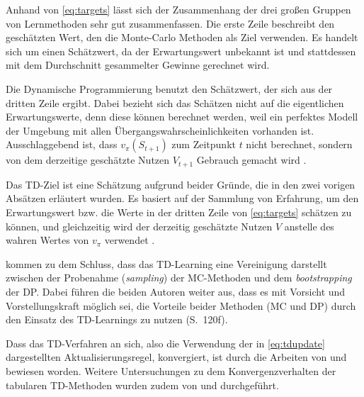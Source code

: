 Anhand von \ref{eq:targets} lässt sich der Zusammenhang der drei großen Gruppen von Lernmethoden sehr gut zusammenfassen. Die erste Zeile beschreibt den geschätzten Wert, den die Monte-Carlo Methoden als Ziel verwenden. Es handelt sich um einen Schätzwert, da der Erwartungswert unbekannt ist und stattdessen mit dem Durchschnitt gesammelter Gewinne gerechnet wird. 
\par 
Die Dynamische Programmierung benutzt den Schätzwert, der sich aus der dritten Zeile ergibt. Dabei bezieht sich das Schätzen nicht auf die eigentlichen Erwartungswerte, denn diese können berechnet werden, weil ein perfektes Modell der Umgebung mit allen Übergangswahrscheinlichkeiten vorhanden ist. Ausschlaggebend ist, dass $v_\pi(S_{t+1})$ zum Zeitpunkt $t$ nicht berechnet, sondern von dem derzeitige geschätzte Nutzen $V_{t+1}$ Gebrauch gemacht wird \cite[S.~120]{Sutton1998}.
\par 
Das TD-Ziel ist eine Schätzung aufgrund beider Gründe, die in den zwei vorigen Absätzen erläutert wurden. Es basiert auf der Sammlung von Erfahrung, um den Erwartungswert bzw. die Werte in der dritten Zeile von \ref{eq:targets} schätzen zu können, und gleichzeitig wird der derzeitig geschätzte Nutzen $V$ anstelle des wahren Wertes von $v_\pi$ verwendet \cite[S.~120f]{Sutton1998}.
\par
\cite{Sutton1998} kommen zu dem Schluss, dass das TD-Learning eine Vereinigung darstellt zwischen der Probenahme (\textit{sampling}) der MC-Methoden und dem \textit{bootstrapping} der DP. Dabei führen die beiden Autoren weiter aus, dass es mit \glqq Vorsicht und Vorstellungskraft\grqq{} möglich sei, die Vorteile beider Methoden (MC und DP) durch den Einsatz des TD-Learnings zu nutzen (S.~120f).
\par
Dass das TD-Verfahren an sich, also die Verwendung der in \ref{eq:tdupdate} dargestellten Aktualisierungsregel, konvergiert, ist durch die Arbeiten von \cite{sutton1988TD} und \cite{dayan} bewiesen worden. Weitere Untersuchungen zu dem Konvergenzverhalten der tabularen TD-Methoden wurden zudem von \cite{jaakkola1994convergence} und \cite{tsitsiklis1994asynchronous} durchgeführt.
\pagebreak
